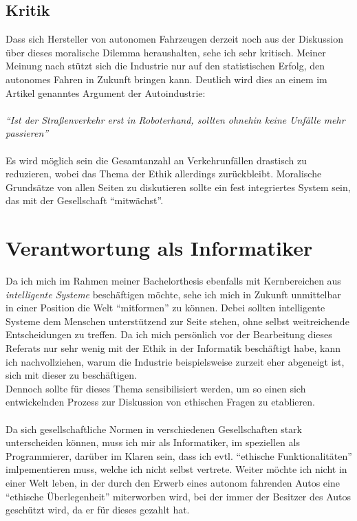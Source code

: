 \documentclass[11pt]{article}
\begin{document}
    \newpage

    \subsection{Kritik}
    Dass sich Hersteller von autonomen Fahrzeugen derzeit noch aus der Diskussion über dieses
    moralische Dilemma heraushalten, sehe ich sehr kritisch. Meiner Meinung nach stützt sich die
    Industrie nur auf den statistischen Erfolg, den autonomes Fahren in Zukunft bringen kann.
    Deutlich wird dies an einem im Artikel genanntes Argument der Autoindustrie:\\~\\
    \textit{"`Ist der Straßenverkehr erst in Roboterhand, sollten ohnehin keine Unfälle mehr
    passieren"'}\\~\\
    Es wird möglich sein die Gesamtanzahl an Verkehrunfällen drastisch zu reduzieren, wobei das
    Thema der Ethik allerdings zurückbleibt. Moralische Grundsätze von allen Seiten zu diskutieren
    sollte ein fest integriertes System sein, das mit der Gesellschaft "`mitwächst"'.

    \section{Verantwortung als Informatiker}
    Da ich mich im Rahmen meiner Bachelorthesis ebenfalls mit Kernbereichen aus \textit{intelligente
    Systeme} beschäftigen möchte, sehe ich mich in Zukunft unmittelbar in einer Position die Welt
    "`mitformen"' zu können. Debei sollten intelligente Systeme dem Menschen unterstützend zur
    Seite stehen, ohne selbst weitreichende Entscheidungen zu treffen. Da ich mich persönlich
    vor der Bearbeitung dieses Referats nur sehr wenig mit der Ethik in der Informatik beschäftigt
    habe, kann ich nachvollziehen, warum die Industrie beispielsweise zurzeit eher abgeneigt ist,
    sich mit dieser zu beschäftigen.\\ Dennoch sollte für dieses Thema sensibilisiert werden, um so
    einen sich entwickelnden Prozess zur Diskussion von ethischen Fragen zu etablieren.\\~\\
    Da sich gesellschaftliche Normen in verschiedenen Gesellschaften stark unterscheiden können,
    muss ich mir als Informatiker, im speziellen als Programmierer, darüber im Klaren sein, dass
    ich evtl. "`ethische Funktionalitäten"' imlpementieren muss, welche ich nicht selbst vertrete.
    Weiter möchte ich nicht in einer Welt leben, in der durch den Erwerb eines autonom fahrenden
    Autos eine "`ethische Überlegenheit"' miterworben wird, bei der immer der Besitzer des Autos
    geschützt wird, da er für dieses gezahlt hat.

    
    
\end{document}
